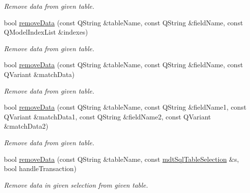 \begin{DoxyCompactItemize}
\begin{DoxyCompactList}\small\item\em Remove data from given table. \end{DoxyCompactList}\item 
bool \hyperlink{classmdt_tt_base_a496e6e995a6bc4e72cade216520898e9}{remove\-Data} (const Q\-String \&table\-Name, const Q\-String \&field\-Name, const Q\-Model\-Index\-List \&indexes)
\begin{DoxyCompactList}\small\item\em Remove data from given table. \end{DoxyCompactList}\item 
bool \hyperlink{classmdt_tt_base_aefe84f30c646a4f53b42fcc102a1126d}{remove\-Data} (const Q\-String \&table\-Name, const Q\-String \&field\-Name, const Q\-Variant \&match\-Data)
\begin{DoxyCompactList}\small\item\em Remove data from given table. \end{DoxyCompactList}\item 
bool \hyperlink{classmdt_tt_base_ae301ec4f49781e9b649a1e49368838a5}{remove\-Data} (const Q\-String \&table\-Name, const Q\-String \&field\-Name1, const Q\-Variant \&match\-Data1, const Q\-String \&field\-Name2, const Q\-Variant \&match\-Data2)
\begin{DoxyCompactList}\small\item\em Remove data from given table. \end{DoxyCompactList}\item 
bool \hyperlink{classmdt_tt_base_a372e33909ae2912e3b69c67d05940910}{remove\-Data} (const Q\-String \&table\-Name, const \hyperlink{classmdt_sql_table_selection}{mdt\-Sql\-Table\-Selection} \&s, bool handle\-Transaction)
\begin{DoxyCompactList}\small\item\em Remove data in given selection from given table. \end{DoxyCompactList}\end{DoxyCompactItemize}
